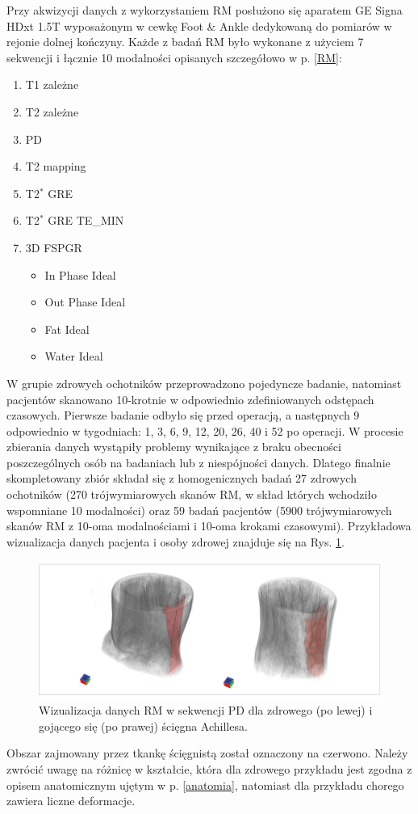 Przy akwizycji danych z wykorzystaniem RM posłużono się aparatem GE Signa HDxt 1.5T wyposażonym w cewkę Foot \& Ankle dedykowaną do pomiarów w rejonie dolnej kończyny. Każde z badań RM było wykonane z użyciem 7 sekwencji i łącznie 10 modalności opisanych szczegółowo w p. \ref{RM}:
\begin{enumerate}
	\item T1 zależne
	\item T2 zależne
	\item PD
	\item T2 mapping
	\item T2$^\ast$ GRE
	\item T2$^\ast$ GRE TE\_MIN
	\item 3D FSPGR
	\begin{itemize}
		\item In Phase Ideal
		\item Out Phase Ideal
		\item Fat Ideal
		\item Water Ideal 
	\end{itemize}
\end{enumerate}

W grupie zdrowych ochotników przeprowadzono pojedyncze badanie, natomiast pacjentów skanowano 10-krotnie w odpowiednio zdefiniowanych odstępach czasowych. Pierwsze badanie odbyło się przed operacją, a następnych 9 odpowiednio \linebreak w tygodniach: 1, 3, 6, 9, 12, 20, 26, 40 i 52 po operacji. W procesie zbierania danych wystąpiły problemy wynikające z braku obecności poszczególnych osób na badaniach lub z niespójności danych. Dlatego finalnie skompletowany zbiór składał się z homogenicznych badań 27 zdrowych ochotników (270 trójwymiarowych skanów RM, w skład których wchodziło wspomniane 10 modalności) oraz 59 badań pacjentów (5900 trójwymiarowych skanów RM z 10-oma modalnościami i 10-oma krokami czasowymi). Przykładowa wizualizacja danych pacjenta i osoby zdrowej znajduje się na Rys. \ref{fig:MRI_sample}. 
\begin{figure}[h!]
	\includegraphics[width=\textwidth]{figures/Data_MRI_sample.jpg}
	\caption{Wizualizacja danych RM w sekwencji PD dla zdrowego (po lewej) i gojącego się (po prawej) ścięgna Achillesa.}
	 \label{fig:MRI_sample}
\end{figure}
Obszar zajmowany przez tkankę ścięgnistą został oznaczony na czerwono. Należy zwrócić uwagę na różnicę w kształcie, która dla zdrowego przykładu jest zgodna z opisem anatomicznym ujętym w p. \ref{anatomia}, natomiast dla przykładu chorego zawiera liczne deformacje. 

